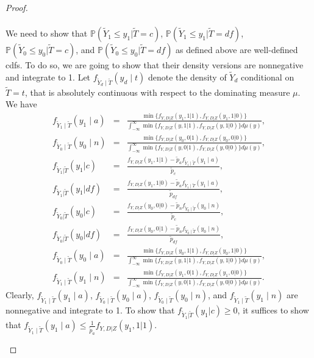 \documentclass[12pt]{article}
\theoremstyle{plain}
\theoremstyle{definition}
\theoremstyle{remark}
\begin{document}
\begin{proof}
\begin{enumerate}
\begin{eqnarray*}
\end{eqnarray*}
We need to show that $\mathbb P(\tilde{Y}_1 \leq y_1 \vert \tilde{T}=c)$, $\mathbb P(\tilde{Y}_1 \leq y_1 \vert \tilde{T}=df)$, $\mathbb P(\tilde{Y}_0 \leq y_0 \vert \tilde{T}=c)$, and $\mathbb P(\tilde{Y}_0 \leq y_0 \vert \tilde{T}=df)$ as defined above are well-defined cdfs. To do so, we are going to show that their density versions are nonnegative and integrate to 1.
Let $f_{\tilde{Y}_d\mid \tilde{T}}(y_d\mid t)$ denote the density of $\tilde{Y}_d$ conditional on $\tilde{T}=t$, that is absolutely continuous with respect to the dominating measure $\mu$. We have
\begin{eqnarray*}
    f_{\tilde{Y}_1 \mid \tilde{T}}(y_1\mid a) &=& \frac{\min\{f_{Y,D\vert Z}(y_1,1\vert 1),f_{Y,D\vert Z}(y_1,1\vert 0)\}}{\int^{\infty}_{-\infty}\min\{f_{Y,D\vert Z}(y,1\vert 1),f_{Y,D\vert Z}(y,1\vert 0)\}d\mu(y)},\\
    f_{\tilde{Y}_0 \mid \tilde{T}}(y_0 \mid n) &=& \frac{\min\{f_{Y,D\vert Z}(y_0,0\vert 1),f_{Y,D\vert Z}(y_0,0\vert 0)\}}{\int^{\infty}_{-\infty}\min\{f_{Y,D\vert Z}(y,0\vert 1),f_{Y,D\vert Z}(y,0\vert 0)\}d\mu(y)},\\
    f_{\tilde{Y}_1 \vert \tilde{T}}(y_1\vert c) &=& \frac{f_{Y, D \vert Z}(y_1,1\vert 1)-\tilde{p}_a f_{\tilde{Y}_1 \mid \tilde{T}}(y_1\mid a)}{\tilde{p}_c},\\
    f_{\tilde{Y}_1 \vert \tilde{T}}(y_1 \vert df) &=& \frac{f_{Y, D \vert Z}(y_1,1\vert 0)-\tilde{p}_a f_{\tilde{Y}_1 \mid \tilde{T}}(y_1\mid a)}{\tilde{p}_{df}},\\
    f_{\tilde{Y}_0 \vert \tilde{T}}(y_0 \vert c) &=& \frac{f_{Y, D \vert Z}(y_0,0 \vert 0)-\tilde{p}_n f_{\tilde{Y}_0 \mid \tilde{T}}(y_0 \mid n)}{\tilde{p}_c},\\
    f_{\tilde{Y}_0 \vert \tilde{T}}(y_0 \vert df) &=& \frac{f_{Y, D \vert Z}(y_0,0 \vert 1)-\tilde{p}_n f_{\tilde{Y}_0 \mid \tilde{T}}(y_0 \mid n)}{\tilde{p}_{df}},\\
    f_{\tilde{Y}_0 \mid \tilde{T}}(y_0\mid a) &=& \frac{\min\{f_{Y,D\vert Z}(y_0,1\vert 1),f_{Y,D\vert Z}(y_0,1\vert 0)\}}{\int^{\infty}_{-\infty}\min\{f_{Y,D\vert Z}(y,1\vert 1),f_{Y,D\vert Z}(y,1\vert 0)\}d\mu(y)},\\
    f_{\tilde{Y}_1 \mid \tilde{T}}(y_1 \mid n) &=& \frac{\min\{f_{Y,D\vert Z}(y_1,0\vert 1),f_{Y,D\vert Z}(y_1,0\vert 0)\}}{\int^{\infty}_{-\infty}\min\{f_{Y,D\vert Z}(y,0\vert 1),f_{Y,D\vert Z}(y,0\vert 0)\}d\mu(y)}. 
\end{eqnarray*}
Clearly, $f_{\tilde{Y}_1 \mid \tilde{T}}(y_1\mid a)$, $f_{\tilde{Y}_0 \mid \tilde{T}}(y_0\mid a)$, $f_{\tilde{Y}_0 \mid \tilde{T}}(y_0 \mid n)$, and $f_{\tilde{Y}_1 \mid \tilde{T}}(y_1 \mid n)$ are nonnegative and integrate to 1. To show that $f_{\tilde{Y}_1 \vert \tilde{T}}(y_1\vert c) \geq 0$, it suffices to show that $f_{\tilde{Y}_1 \mid \tilde{T}}(y_1\mid a) \leq \frac{1}{\tilde{p}_a}f_{Y, D \vert Z}(y_1,1\vert 1)$.


\end{enumerate}
\end{proof}
\end{document}
